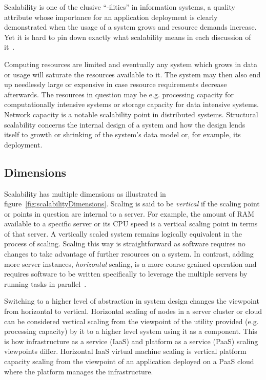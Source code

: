 \documentclass[english]{tktltiki2}
\theoremstyle{definition}
\theoremstyle{remark}
\begin{document}
Scalability is one of the elusive ``-ilities'' in information systems, a quality
attribute whose importance for an application deployment is clearly demonstrated
when the usage of a system grows and resource demands increase. Yet it is
hard to pin down exactly what scalability means in each discussion of
it~\cite{ScalabilityHill1990}.

Computing resources are limited and eventually any system which grows in data or
usage will saturate the resources available to it. The system may then also end
up needlessly large or expensive in case resource requirements decrease
afterwards. The resources in question may be e.g. processing capacity for
computationally intensive systems or storage capacity for data intensive
systems. Network capacity is a notable scalability point in distributed systems.
Structural scalability concerns the internal design of a system and how the
design lends itself to growth or shrinking of the system’s data model or, for
example, its deployment.

\subsection{Dimensions}


Scalability has multiple dimensions as illustrated in
figure~\ref{fig:scalabilityDimensions}. Scaling is said to be \emph{vertical} if
the scaling point or points in question are internal to a server. For example,
the amount of RAM available to a specific server or its CPU speed is a vertical
scaling point in terms of that server. A vertically scaled system remains
logically equivalent in the process of scaling. Scaling this way is
straightforward as software requires no changes to take advantage of further
resources on a system. In contrast, adding more server instances,
\emph{horizontal} scaling, is a more coarse grained operation and requires
software to be written specifically to leverage the multiple servers by running
tasks in parallel~\cite{handbook-scaling}.


Switching to a higher level of abstraction in system design changes the
viewpoint from horizontal to vertical. Horizontal scaling of nodes in a server
cluster or cloud can be considered vertical scaling from the viewpoint of the
utility provided (e.g. processing capacity) by it to a higher level system using
it as a component. This is how infrastructure as a service (IaaS) and platform
as a service (PaaS) scaling viewpoints differ. Horizontal IaaS virtual machine
scaling is vertical platform capacity scaling from the viewpoint of an
application deployed on a PaaS cloud where the platform manages the
infrastructure.
\end{document}
